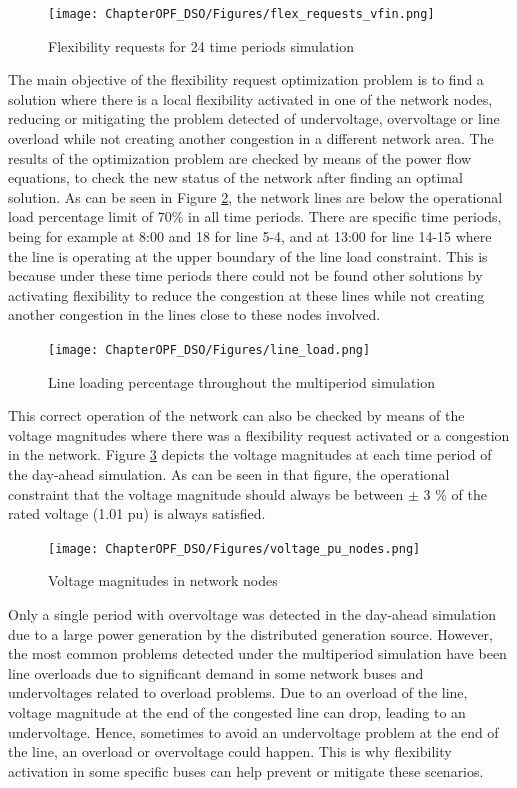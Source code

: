 \begin{figure}[htbp]
	\centering
	\texttt{[image: ChapterOPF\_DSO/Figures/flex\_requests\_vfin.png]}
	\caption{Flexibility requests for 24 time periods simulation}
	\label{fig:flex_requests}  
\end{figure}

The main objective of the flexibility request optimization problem is to find a solution where there is a local flexibility activated in one of the network nodes, reducing or mitigating the problem detected of undervoltage, overvoltage or line overload while not creating another congestion in a different network area. 
The results of the optimization problem are checked by means of the power flow equations, to check the new status of the network after finding an optimal solution. As can be seen in Figure \ref{fig:line_load}, the network lines are below the operational load percentage limit of 70\% in all time periods. There are specific time periods, being for example at 8:00 and 18 for line 5-4, and at 13:00 for line 14-15 where the line is operating at the upper boundary of the line load constraint. This is because under these time periods there could not be found other solutions by activating flexibility to reduce the congestion at these lines while not creating another congestion in the lines close to these nodes involved. 

\begin{figure}[htbp]
	\centering
	\texttt{[image: ChapterOPF\_DSO/Figures/line\_load.png]}
	\caption{Line loading percentage throughout the multiperiod simulation}
	\label{fig:line_load}  
\end{figure}

This correct operation of the network can also be checked by means of the voltage magnitudes where there was a flexibility request activated or a congestion in the network. Figure \ref{fig:voltage_magnitudes} depicts the voltage magnitudes at each time period of the day-ahead simulation. As  can be seen in that figure, the operational constraint that the voltage magnitude should always be between $\pm$ 3 \% of the rated voltage (1.01 pu) is always satisfied.
 
\begin{figure}[htbp]
	\centering
	\texttt{[image: ChapterOPF\_DSO/Figures/voltage\_pu\_nodes.png]}
	\caption{Voltage magnitudes in network nodes}
	\label{fig:voltage_magnitudes}  
\end{figure}

Only a single period with overvoltage was detected in the day-ahead simulation due to a large power generation by the distributed generation source. However, the most common problems detected under the multiperiod simulation have been line overloads due to significant demand in some network buses and undervoltages related to overload problems. Due to an overload of the line, voltage magnitude at the end of the congested line can drop, leading to an undervoltage. Hence, sometimes to avoid an undervoltage problem at the end of the line, an overload or overvoltage could happen. This is why flexibility activation in some specific buses can help prevent or mitigate these scenarios. 

